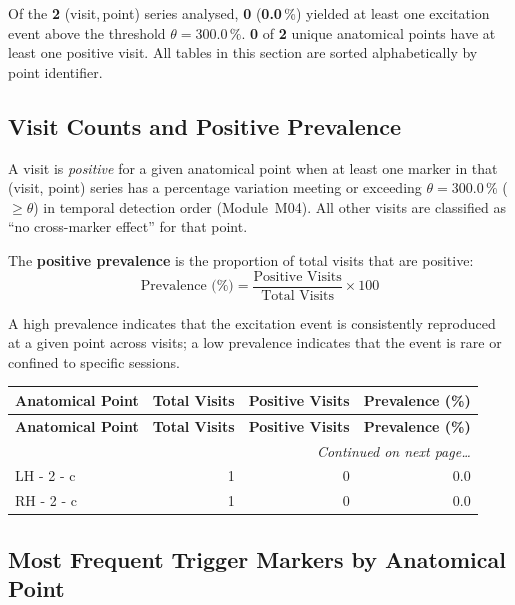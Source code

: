 \documentclass[a4paper,11pt]{article}
\begin{document}
\noindent
Of the \textbf{2} (visit,\,point) series analysed,
\textbf{0} (\textbf{0.0}\,\%) yielded at least one
excitation event above the threshold $\theta = 300.0\,\%$.
\textbf{0} of \textbf{2} unique anatomical points
have at least one positive visit.
All tables in this section are sorted alphabetically by point identifier.

\subsection{Visit Counts and Positive Prevalence}

A visit is \emph{positive} for a given anatomical point when at least one marker in that
(visit, point) series has a percentage variation meeting or exceeding
$\theta = 300.0\,\%$ ($\geq \theta$) in temporal detection order (Module~M04).
All other visits are classified as ``no cross-marker effect'' for that point.

The \textbf{positive prevalence} is the proportion of total visits that are positive:
\[
  \text{Prevalence (\%)} = \frac{\text{Positive Visits}}{\text{Total Visits}} \times 100
\]

A high prevalence indicates that the excitation event is consistently reproduced at a given
point across visits; a low prevalence indicates that the event is rare or confined to
specific sessions.

\begin{small}
\begin{longtable}{p{5cm}rrr}
\toprule
\textbf{Anatomical Point} &
\textbf{Total Visits} &
\textbf{Positive Visits} &
\textbf{Prevalence (\%)} \\
\midrule
\endfirsthead
\toprule
\textbf{Anatomical Point} &
\textbf{Total Visits} &
\textbf{Positive Visits} &
\textbf{Prevalence (\%)} \\
\midrule
\endhead
\midrule
\multicolumn{4}{r}{\small\emph{Continued on next page\ldots}} \\
\endfoot
\bottomrule
\endlastfoot
LH - 2 - c & 1 & 0 & 0.0 \\
RH - 2 - c & 1 & 0 & 0.0 \\
\end{longtable}
\end{small}

\subsection{Most Frequent Trigger Markers by Anatomical Point}
\end{document}
